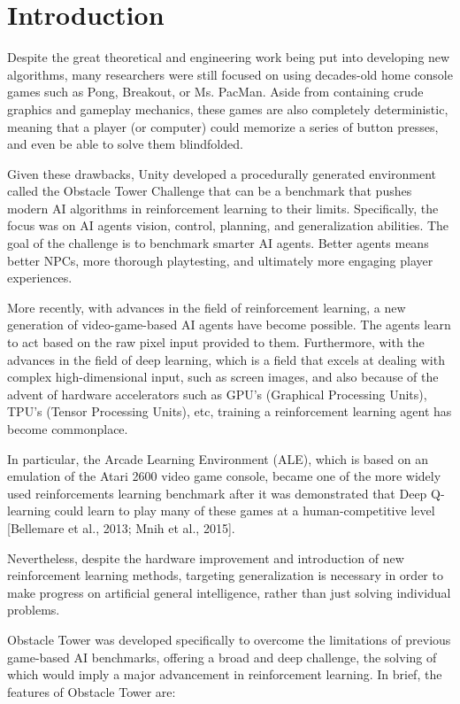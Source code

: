 \documentclass[conference]{IEEEtran}
\begin{document}
\section{Introduction}
Despite the great theoretical and engineering work being put into developing new algorithms, many researchers were still focused on using decades-old home console games such as Pong, Breakout, or Ms. PacMan. Aside from containing crude graphics and gameplay mechanics, these games are also completely deterministic, meaning that a player (or computer) could memorize a series of button presses, and even be able to solve them blindfolded. 

Given these drawbacks, Unity developed a procedurally generated environment called the Obstacle Tower Challenge that can be a benchmark that pushes modern AI algorithms in reinforcement learning to their limits. Specifically, the focus was on AI agents vision, control, planning, and generalization abilities. 
The goal of the challenge is to benchmark smarter AI agents. Better agents means better NPCs, more thorough playtesting, and ultimately more engaging player experiences.

More recently, with advances in the field of reinforcement learning, a new generation of video-game-based AI agents have become possible. The agents learn to act based on the raw pixel input provided to them. Furthermore, with the advances in the field of deep learning, which is a field that excels at dealing with complex high-dimensional input, such as screen images, and also because of the advent of hardware accelerators such as GPU's (Graphical Processing Units), TPU's (Tensor Processing Units), etc, training a reinforcement learning agent has become commonplace.

In particular, the Arcade Learning Environment (ALE), which is based on an emulation of the Atari 2600 video game console, became one of the more widely used reinforcements learning benchmark after it was demonstrated that Deep Q-learning could learn to play many of these games at a human-competitive level [Bellemare et al., 2013; Mnih et al., 2015].

Nevertheless, despite the hardware improvement and introduction of new reinforcement learning methods, targeting generalization is
necessary in order to make progress on artificial general intelligence, rather than just solving individual problems.

Obstacle Tower was developed specifically to overcome the limitations of previous game-based AI benchmarks, offering a broad and deep challenge, the solving of which would imply a major advancement in reinforcement learning. In brief, the features of Obstacle Tower are:
\end{document}
